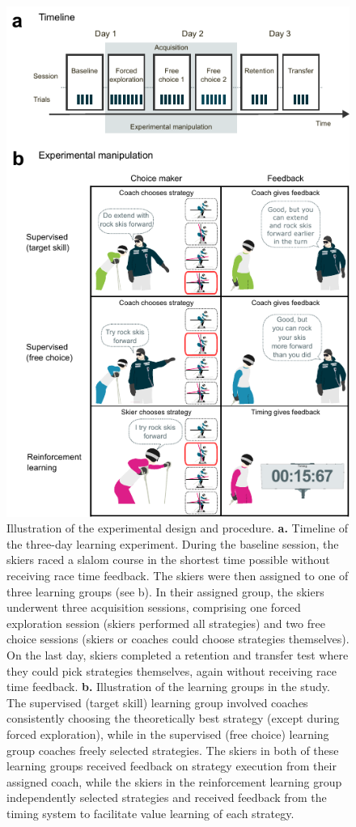 \documentclass[pdflatex,sn-nature]{sn-jnl}%
\theoremstyle{thmstyleone}%
\theoremstyle{thmstyletwo}%
\theoremstyle{thmstylethree}%
\begin{document}
\begin{figure}[H]
\centering
\includegraphics{figures/figure_method_experiment.pdf}
\caption{Illustration of the experimental design and procedure. \textbf{a.} Timeline of the three-day learning experiment. During the baseline session, the skiers raced a slalom course in the shortest time possible without receiving race time feedback. The skiers were then assigned to one of three learning groups (see b). In their assigned group, the skiers underwent three acquisition sessions, comprising one forced exploration session (skiers performed all strategies) and two free choice sessions (skiers or coaches could choose strategies themselves). On the last day, skiers completed a retention and transfer test where they could pick strategies themselves, again without receiving race time feedback. \textbf{b.} Illustration of the learning groups in the study. The supervised (target skill) learning group involved coaches consistently choosing the theoretically best strategy (except during forced exploration), while in the supervised (free choice) learning group coaches freely selected strategies. The skiers in both of these learning groups received feedback on strategy execution from their assigned coach, while the skiers in the reinforcement learning group independently selected strategies and received feedback from the timing system to facilitate value learning of each strategy.}
\label{fig:experiment}
\end{figure}
\end{document}
